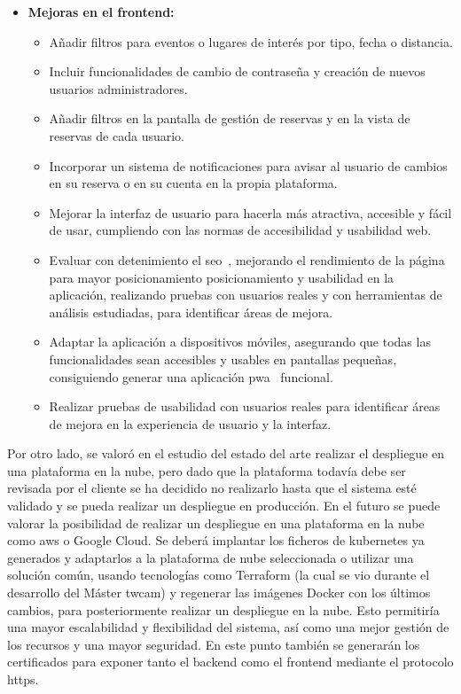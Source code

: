 \begin{itemize}
    \item \textbf{Mejoras en el frontend:}
    \begin{itemize}
        \item Añadir filtros para eventos o lugares de interés por tipo, fecha o distancia.
        \item Incluir funcionalidades de cambio de contraseña y creación de nuevos usuarios administradores.
        \item Añadir filtros en la pantalla de gestión de reservas y en la vista de reservas de cada usuario.
        \item Incorporar un sistema de notificaciones para avisar al usuario de cambios en su reserva o en su cuenta en la propia plataforma.
        \item Mejorar la interfaz de usuario para hacerla más atractiva, accesible y fácil de usar, cumpliendo con las normas de accesibilidad y usabilidad web.
        \item Evaluar con detenimiento el \gls{seo}~\cite{ologunebi2023seo}, mejorando el rendimiento de la página para mayor posicionamiento posicionamiento y usabilidad en la aplicación, realizando pruebas con usuarios reales y con herramientas de análisis estudiadas, para identificar áreas de mejora.
        \item Adaptar la aplicación a dispositivos móviles, asegurando que todas las funcionalidades sean accesibles y usables en pantallas pequeñas, consiguiendo generar una aplicación \gls{pwa}~\cite{fernandez2023pwa} funcional.
        \item Realizar pruebas de usabilidad con usuarios reales para identificar áreas de mejora en la experiencia de usuario y la interfaz.
    \end{itemize}
\end{itemize}


Por otro lado, se valoró en el estudio del estado del arte realizar el despliegue en una plataforma en la nube, pero dado que la plataforma todavía debe ser revisada por el cliente se ha decidido no realizarlo hasta que el sistema esté validado y se pueda realizar un despliegue en producción. En el futuro se puede valorar la posibilidad de realizar un despliegue en una plataforma en la nube como \gls{aws} o Google Cloud. Se deberá implantar los ficheros de \gls{kubernetes} ya generados y adaptarlos a la plataforma de nube seleccionada o utilizar una solución común, usando tecnologías como Terraform (la cual se vio durante el desarrollo del Máster \gls{twcam}) y regenerar las imágenes Docker con los últimos cambios, para posteriormente realizar un despliegue en la nube. Esto permitiría una mayor escalabilidad y flexibilidad del sistema, así como una mejor gestión de los recursos y una mayor seguridad. En este punto también se generarán los certificados para exponer tanto el \gls{backend} como el \gls{frontend} mediante el protocolo \gls{https}.
